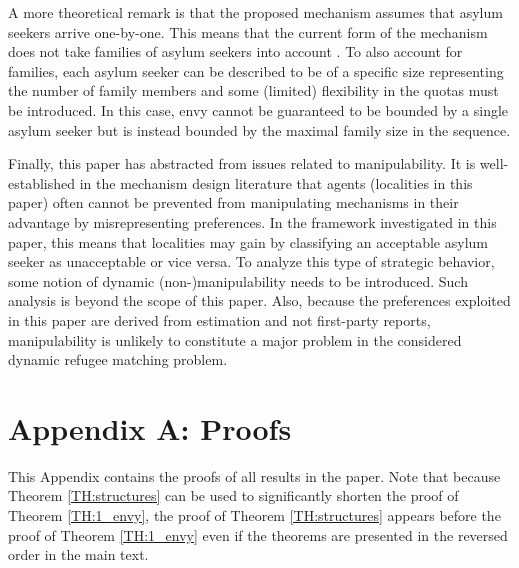 \documentclass[12pt,fleqn]{article}
\begin{document}
A more theoretical remark is that the proposed mechanism assumes that asylum seekers arrive one-by-one. This means that the current form of the mechanism does not take families of asylum seekers into account \citep[see, e.g.,][for a mechanism that keeps families intact in house allocation problems with asylum seekers]{bib:AnderssonEhlers}. To also account for families, each asylum seeker can be described to be of a specific size representing the number of family members and some (limited) flexibility in the quotas must be introduced. In this case, envy cannot be guaranteed to be bounded by a single asylum seeker but is instead bounded by the maximal family size in the sequence.

Finally, this paper has abstracted from issues related to manipulability. It is  well-established in the mechanism design literature that agents (localities in this paper) often cannot be prevented from manipulating mechanisms in their advantage by misrepresenting preferences. In the framework investigated in this paper, this means that localities may gain by classifying an acceptable asylum seeker as unacceptable or vice versa. To analyze this type of strategic behavior, some notion of dynamic (non-)manipulability needs to be introduced. Such analysis is beyond the scope of this paper. Also, because the preferences exploited in this paper are derived from estimation and not first-party reports, manipulability is unlikely to constitute a major problem in the considered dynamic refugee matching problem.




\newpage

\section*{Appendix A: Proofs}
This Appendix contains the proofs of all results in the paper. Note that because Theorem \ref{TH:structures} can be used to significantly shorten the proof of Theorem \ref{TH:1_envy}, the proof of Theorem \ref{TH:structures} appears before the proof of Theorem \ref{TH:1_envy} even if the theorems are presented in the reversed order in the main text.

\medskip
\end{document}
